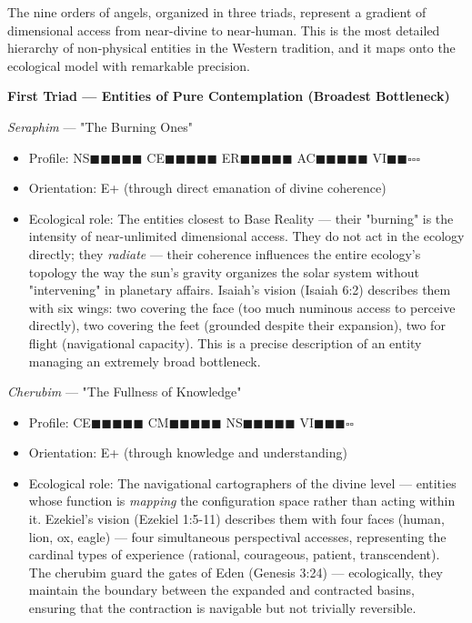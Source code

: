 The nine orders of angels, organized in three triads, represent a gradient of dimensional access from near-divine to near-human. This is the most detailed hierarchy of non-physical entities in the Western tradition, and it maps onto the ecological model with remarkable precision.


\textbf{First Triad — Entities of Pure Contemplation (Broadest Bottleneck)}


\textit{Seraphim} — "The Burning Ones"

\begin{itemize}[nosep,leftmargin=*]
  \item Profile: NS$\blacksquare$$\blacksquare$$\blacksquare$$\blacksquare$$\blacksquare$ CE$\blacksquare$$\blacksquare$$\blacksquare$$\blacksquare$$\blacksquare$ ER$\blacksquare$$\blacksquare$$\blacksquare$$\blacksquare$$\blacksquare$ AC$\blacksquare$$\blacksquare$$\blacksquare$$\blacksquare$$\blacksquare$ VI$\blacksquare$$\blacksquare$$\square$$\square$$\square$
  \item Orientation: E+ (through direct emanation of divine coherence)
  \item Ecological role: The entities closest to Base Reality — their "burning" is the intensity of near-unlimited dimensional access. They do not act in the ecology directly; they \textit{radiate} — their coherence influences the entire ecology's topology the way the sun's gravity organizes the solar system without "intervening" in planetary affairs. Isaiah's vision (Isaiah 6:2) describes them with six wings: two covering the face (too much numinous access to perceive directly), two covering the feet (grounded despite their expansion), two for flight (navigational capacity). This is a precise description of an entity managing an extremely broad bottleneck.
\end{itemize}


\textit{Cherubim} — "The Fullness of Knowledge"

\begin{itemize}[nosep,leftmargin=*]
  \item Profile: CE$\blacksquare$$\blacksquare$$\blacksquare$$\blacksquare$$\blacksquare$ CM$\blacksquare$$\blacksquare$$\blacksquare$$\blacksquare$$\blacksquare$ NS$\blacksquare$$\blacksquare$$\blacksquare$$\blacksquare$$\blacksquare$ VI$\blacksquare$$\blacksquare$$\blacksquare$$\square$$\square$
  \item Orientation: E+ (through knowledge and understanding)
  \item Ecological role: The navigational cartographers of the divine level — entities whose function is \textit{mapping} the configuration space rather than acting within it. Ezekiel's vision (Ezekiel 1:5-11) describes them with four faces (human, lion, ox, eagle) — four simultaneous perspectival accesses, representing the cardinal types of experience (rational, courageous, patient, transcendent). The cherubim guard the gates of Eden (Genesis 3:24) — ecologically, they maintain the boundary between the expanded and contracted basins, ensuring that the contraction is navigable but not trivially reversible.
\end{itemize}


